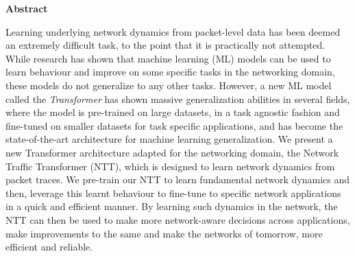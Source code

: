 \clearpage
\null
\vfil
\thispagestyle{plain}
\begin{center}\textbf{Abstract}\end{center}

Learning underlying network dynamics from packet-level data has been deemed an extremely difficult task, to the point that it is practically not attempted. While research has shown that machine learning (ML) models can be used to learn behaviour and improve on some specific tasks in the networking domain, these models do not generalize to any other tasks. However, a new ML model called the \emph{Transformer} has shown massive generalization abilities in several fields, where the model is pre-trained on large datasets, in a task agnostic fashion and fine-tuned on smaller datasets for task specific applications, and has become the state-of-the-art architecture for machine learning generalization. We present a new Transformer architecture adapted for the networking domain, the Network Traffic Transformer (NTT), which is designed to learn network dynamics from packet traces. We pre-train our NTT to learn fundamental network dynamics and then, leverage this learnt behaviour to fine-tune to specific network applications in a quick and efficient manner. By learning such dynamics in the network, the NTT can then be used to make more network-aware decisions across applications, make improvements to the same and make the networks of tomorrow, more efficient and reliable.


\vfil
\clearpage 
